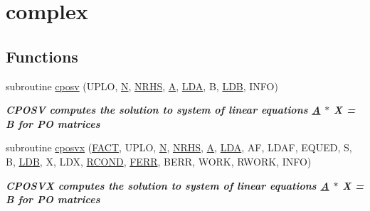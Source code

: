 \hypertarget{group__complexPOsolve}{}\section{complex}
\label{group__complexPOsolve}
\subsection*{Functions}
\begin{DoxyCompactItemize}
\item 
subroutine \hyperlink{group__complexPOsolve_gad6fa5e367df37b944f5224b5dcc6ab50}{cposv} (U\+P\+L\+O, \hyperlink{polmisc_8c_a0240ac851181b84ac374872dc5434ee4}{N}, \hyperlink{example__user_8c_aa0138da002ce2a90360df2f521eb3198}{N\+R\+H\+S}, \hyperlink{classA}{A}, \hyperlink{example__user_8c_ae946da542ce0db94dced19b2ecefd1aa}{L\+D\+A}, B, \hyperlink{example__user_8c_a50e90a7104df172b5a89a06c47fcca04}{L\+D\+B}, I\+N\+F\+O)
\begin{DoxyCompactList}\small\item\em {\bfseries  C\+P\+O\+S\+V computes the solution to system of linear equations \hyperlink{classA}{A} $\ast$ X = B for P\+O matrices} \end{DoxyCompactList}\item 
subroutine \hyperlink{group__complexPOsolve_ga9743510437973e846efd4fe6a0a4b704}{cposvx} (\hyperlink{superlu__enum__consts_8h_af00a42ecad444bbda75cde1b64bd7e72a1b6692b56d378abb85bd49063721d034}{F\+A\+C\+T}, U\+P\+L\+O, \hyperlink{polmisc_8c_a0240ac851181b84ac374872dc5434ee4}{N}, \hyperlink{example__user_8c_aa0138da002ce2a90360df2f521eb3198}{N\+R\+H\+S}, \hyperlink{classA}{A}, \hyperlink{example__user_8c_ae946da542ce0db94dced19b2ecefd1aa}{L\+D\+A}, A\+F, L\+D\+A\+F, E\+Q\+U\+E\+D, S, B, \hyperlink{example__user_8c_a50e90a7104df172b5a89a06c47fcca04}{L\+D\+B}, X, L\+D\+X, \hyperlink{superlu__enum__consts_8h_af00a42ecad444bbda75cde1b64bd7e72a9b5c151728d8512307565994c89919d5}{R\+C\+O\+N\+D}, \hyperlink{superlu__enum__consts_8h_af00a42ecad444bbda75cde1b64bd7e72a78fd14d7abebae04095cfbe02928f153}{F\+E\+R\+R}, B\+E\+R\+R, W\+O\+R\+K, R\+W\+O\+R\+K, I\+N\+F\+O)
\begin{DoxyCompactList}\small\item\em {\bfseries  C\+P\+O\+S\+V\+X computes the solution to system of linear equations \hyperlink{classA}{A} $\ast$ X = B for P\+O matrices} \end{DoxyCompactList}\item 

\end{DoxyCompactItemize}
